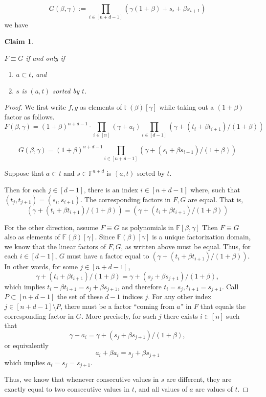 \documentclass[11pt]{article} %
\newcommand{\F}{\ensuremath{\mathbb F}\xspace}
\newcommand{\defeq}{:=}
\newtheorem{claim}[lemma]{Claim}
\begin{document}
\[G(\beta,\gamma) \defeq \prod_{i\in [n+d-1]} \left( \gamma(1+\beta) + s_i + \beta s_{i+1} \right)\]
we have
\begin{claim}\label{clm:main_lookup}

 $F\equiv G$ if and only if 
 \begin{enumerate}
  \item $a \subset t$, and 
  \item $s$ is $(a,t)$ sorted by $t$. 
 \end{enumerate}

\end{claim}
\begin{proof}
 We first write $f,g$ as elements of $\F(\beta)[\gamma]$ while taking out a $(1+\beta)$ factor as follows.
\[F(\beta,\gamma) = (1+\beta)^{n+d-1}\cdot \prod_{i\in [n]} (\gamma + a_i) \prod_{i\in [d-1]} \left(\gamma + (t_i + \beta t_{i+1})/(1+\beta)\right)\]
                                  
\[G(\beta,\gamma)  = (1+\beta)^{n+d-1} \prod_{i\in [n+d-1]} \left( \gamma+ (s_i + \beta s_{i+1})/(1+\beta) \right)\]
 
 
 Suppose that $a\subset t$ and $s\in \F^{n+d}$ is $(a,t)$ sorted by $t$.

 Then for each $j\in [d-1]$, there is an index $i\in [n+d-1]$ where, such that
 $ (t_j,t_{j+1})=(s_i,s_{i+1})$.
 The corresponding factors in $F,G$ are equal. That is,
 \[(\gamma + (t_i + \beta t_{i+1})/(1+\beta)) = (\gamma + (t_i + \beta t_{i+1})/(1+\beta))\]
 
 
 
 For the other direction, assume $F\equiv G$ as polynomials in $\F[\beta,\gamma]$
 Then $F\equiv G$ also as elements of $\F(\beta)[\gamma]$.
 Since $\F(\beta)[\gamma]$ is a unique factorization domain, we know that the linear factors of $F,G$, as written above must be equal.
 Thus, for each $i\in [d-1]$, $G$ must have a factor equal to $(\gamma + (t_i + \beta t_{i+1})/(1+\beta))$.
 In other words, for some $j\in [n+d-1]$, 
 \[\gamma + (t_i + \beta t_{i+1})/(1+\beta)= \gamma+ (s_j + \beta s_{j+1})/(1+\beta),\]
 which implies $t_i + \beta t_{i+1}= s_j + \beta s_{j+1}$, and therefore $t_i= s_j, t_{i+1}=s_{j+1}$.
 Call $P\subset [n+d-1]$ the set of these $d-1$ indices $j$.
 For any other index $j\in [n+d-1]\setminus P$, there must be a factor ``coming from $a$'' in $F$ that equals the corresponding factor in $G$. More precisely, for such $j$ there exists $i\in [n]$ such that
 \[\gamma + a_i = \gamma+ (s_j + \beta s_{j+1})/(1+\beta),\]
 or equivalently
 \[a_i+ \beta a_i = s_j + \beta s_{j+1}\]
 which implies
 $a_i= s_j=s_{j+1}$.
 
 Thus, we know that whenever consecutive values in $s$ are different, they are exactly equal to two consecutive values in $t$, and all values of $a$ are values of $t$.
 
 \end{proof}
 
\end{document}
